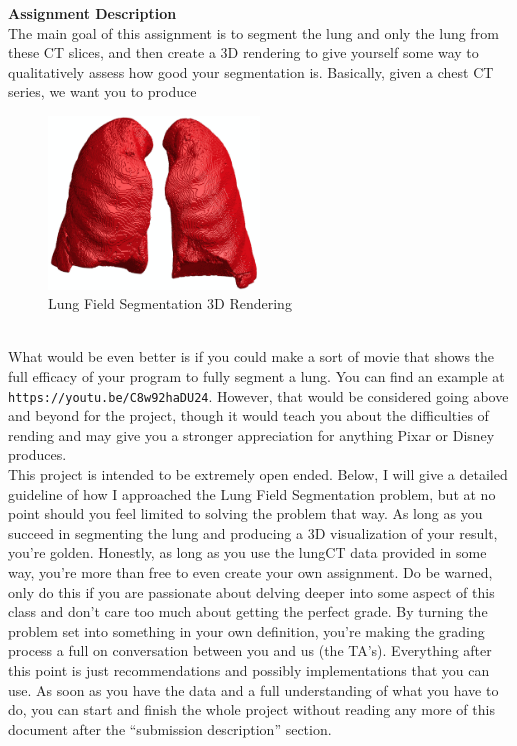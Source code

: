 \documentclass[10pt]{article}
\begin{document}
\clearpage
\noindent \Large \textbf{Assignment Description} \normalsize \\
\noindent\makebox[\linewidth]{\rule{\textwidth}{0.4pt}}
\indent The main goal of this assignment is to segment the lung and only the lung from these CT slices, and then create a 3D rendering to give yourself some way to qualitatively assess how good your segmentation is.  Basically, given a chest CT series, we want you to produce
\begin{figure}[h]
	\centering
	\includegraphics[width = 0.5\textwidth]{figures/lung_field_segmentation}
	\caption{Lung Field Segmentation 3D Rendering}
	\label{fig:LFS}
\end{figure}\\
What would be even better is if you could make a sort of movie that shows the full efficacy of your program to fully segment a lung.  You can find an example at \texttt{https://youtu.be/C8w92haDU24}.  However, that would be considered going above and beyond for the project, though it would teach you about the difficulties of rending and may give you a stronger appreciation for anything Pixar or Disney produces.\\
\indent This project is intended to be extremely open ended.  Below, I will give a detailed guideline of how I approached the Lung Field Segmentation problem, but at no point should you feel limited to solving the problem that way.  As long as you succeed in segmenting the lung and producing a 3D visualization of your result, you're golden.  Honestly, as long as you use the lungCT data provided in some way, you're more than free to even create your own assignment.  Do be warned, only do this if you are passionate about delving deeper into some aspect of this class and don't care too much about getting the perfect grade.  By turning the problem set into something in your own definition, you're making the grading process a full on conversation between you and us (the TA's).    Everything after this point is just recommendations and possibly implementations that you can use.  As soon as you have the data and a full understanding of what you have to do, you can start and finish the whole project without reading any more of this document after the ``submission description'' section.\\
\ \\
\ \\
\end{document}
